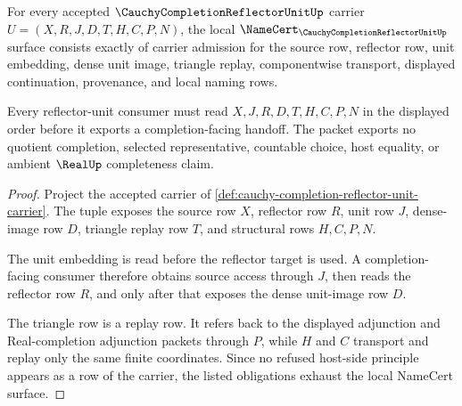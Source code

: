 \begin{theorem}
\label{thm:cauchy-completion-reflector-unit-namecert-obligations}
For every accepted $\CauchyCompletionReflectorUnitUp$ carrier $U=(X,R,J,D,T,H,C,P,N)$, the local $\NameCert_{\CauchyCompletionReflectorUnitUp}$ surface consists exactly of carrier admission for the source row, reflector row, unit embedding, dense unit image, triangle replay, componentwise transport, displayed continuation, provenance, and local naming rows.

Every reflector-unit consumer must read $X,J,R,D,T,H,C,P,N$ in the displayed order before it exports a completion-facing handoff. The packet exports no quotient completion, selected representative, countable choice, host equality, or ambient $\RealUp$ completeness claim.
\end{theorem}
\begin{proof}
Project the accepted carrier of \autoref{def:cauchy-completion-reflector-unit-carrier}. The tuple exposes the source row $X$, reflector row $R$, unit row $J$, dense-image row $D$, triangle replay row $T$, and structural rows $H,C,P,N$.

The unit embedding is read before the reflector target is used. A completion-facing consumer therefore obtains source access through $J$, then reads the reflector row $R$, and only after that exposes the dense unit-image row $D$.

The triangle row is a replay row. It refers back to the displayed adjunction and Real-completion adjunction packets through $P$, while $H$ and $C$ transport and replay only the same finite coordinates. Since no refused host-side principle appears as a row of the carrier, the listed obligations exhaust the local NameCert surface.
\end{proof}

